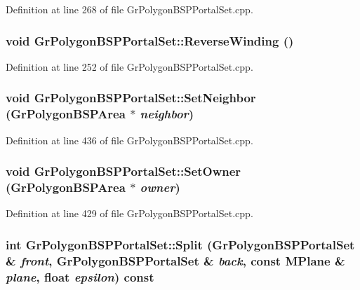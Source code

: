 Definition at line 268 of file GrPolygonBSPPortalSet.cpp.\hypertarget{class_gr_polygon_b_s_p_portal_set_c5ed27275dfb126e94fbf1da5a5e787f}{
\subsubsection[{ReverseWinding}]{\setlength{\rightskip}{0pt plus 5cm}void GrPolygonBSPPortalSet::ReverseWinding ()}}
\label{class_gr_polygon_b_s_p_portal_set_c5ed27275dfb126e94fbf1da5a5e787f}




Definition at line 252 of file GrPolygonBSPPortalSet.cpp.\hypertarget{class_gr_polygon_b_s_p_portal_set_d095e8a7483db5cbe0fc518b234bf964}{
\subsubsection[{SetNeighbor}]{\setlength{\rightskip}{0pt plus 5cm}void GrPolygonBSPPortalSet::SetNeighbor ({\bf GrPolygonBSPArea} $\ast$ {\em neighbor})}}
\label{class_gr_polygon_b_s_p_portal_set_d095e8a7483db5cbe0fc518b234bf964}




Definition at line 436 of file GrPolygonBSPPortalSet.cpp.\hypertarget{class_gr_polygon_b_s_p_portal_set_bf746cf2cfeaf5b44a803625986ba073}{
\subsubsection[{SetOwner}]{\setlength{\rightskip}{0pt plus 5cm}void GrPolygonBSPPortalSet::SetOwner ({\bf GrPolygonBSPArea} $\ast$ {\em owner})}}
\label{class_gr_polygon_b_s_p_portal_set_bf746cf2cfeaf5b44a803625986ba073}




Definition at line 429 of file GrPolygonBSPPortalSet.cpp.\hypertarget{class_gr_polygon_b_s_p_portal_set_9215f97cca8ae51fc89dd82487fc14f2}{
\subsubsection[{Split}]{\setlength{\rightskip}{0pt plus 5cm}int GrPolygonBSPPortalSet::Split ({\bf GrPolygonBSPPortalSet} \& {\em front}, \/  {\bf GrPolygonBSPPortalSet} \& {\em back}, \/  const {\bf MPlane} \& {\em plane}, \/  float {\em epsilon}) const}}
\label{class_gr_polygon_b_s_p_portal_set_9215f97cca8ae51fc89dd82487fc14f2}




